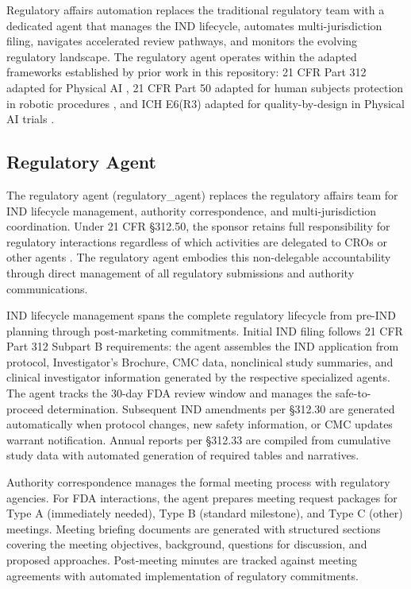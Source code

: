
Regulatory affairs automation replaces the traditional regulatory team with a dedicated
agent that manages the IND lifecycle, automates multi-jurisdiction filing, navigates
accelerated review pathways, and monitors the evolving regulatory landscape. The
regulatory agent operates within the adapted frameworks established by prior work in this
repository: 21 CFR Part 312 adapted for Physical AI \cite{cfr312-adapt}, 21 CFR Part 50
adapted for human subjects protection in robotic procedures \cite{cfr50-adapt}, and ICH
E6(R3) adapted for quality-by-design in Physical AI trials \cite{ich-adapt}.

\subsection{Regulatory Agent}

The regulatory agent (regulatory\_agent) replaces the regulatory affairs team for IND
lifecycle management, authority correspondence, and multi-jurisdiction coordination. Under
21 CFR \S312.50, the sponsor retains full responsibility for regulatory interactions
regardless of which activities are delegated to CROs or other agents
\cite{cfr-part-312}. The regulatory agent embodies this non-delegable accountability
through direct management of all regulatory submissions and authority communications.

IND lifecycle management spans the complete regulatory lifecycle from pre-IND planning
through post-marketing commitments. Initial IND filing follows 21 CFR Part 312 Subpart B
requirements: the agent assembles the IND application from protocol, Investigator's
Brochure, CMC data, nonclinical study summaries, and clinical investigator information
generated by the respective specialized agents. The agent tracks the 30-day FDA review
window and manages the safe-to-proceed determination. Subsequent IND amendments per
\S312.30 are generated automatically when protocol changes, new safety information, or
CMC updates warrant notification. Annual reports per \S312.33 are compiled from
cumulative study data with automated generation of required tables and narratives.

Authority correspondence manages the formal meeting process with regulatory agencies.
For FDA interactions, the agent prepares meeting request packages for Type A (immediately
needed), Type B (standard milestone), and Type C (other) meetings. Meeting briefing
documents are generated with structured sections covering the meeting objectives,
background, questions for discussion, and proposed approaches. Post-meeting minutes are
tracked against meeting agreements with automated implementation of regulatory
commitments.


